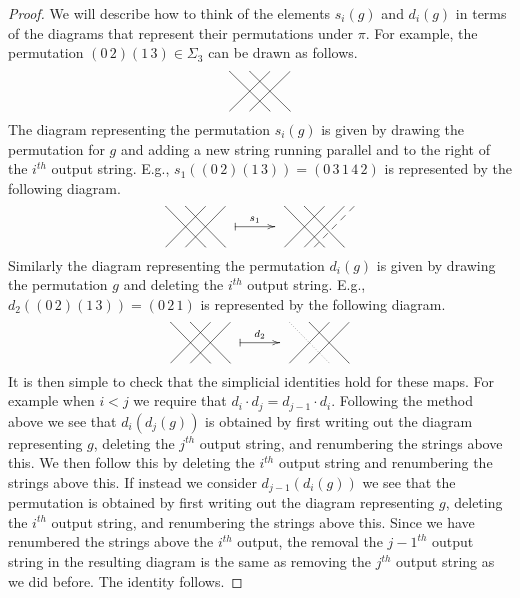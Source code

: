 \documentclass[11pt]{article}
\theoremstyle{definition}
\theoremstyle{plain}
\begin{document}
\begin{proof}
    We will describe how to think of the elements $s_i(g)$ and $d_i(g)$ in terms of the diagrams that represent their permutations under $\pi$. For example, the permutation $(0 \, 2)(1 \, 3) \in \Sigma_{3}$ can be drawn as follows.
        \[
            \xy
                {\ar@{-} (0,0) ; (10,-10)};
                {\ar@{-} (5,0) ; (15,-10)};
                {\ar@{-} (10,0) ; (0,-10)};
                {\ar@{-} (15,0) ; (5,-10)};
            \endxy
        \]
    The diagram representing the permutation $s_i(g)$ is given by drawing the permutation for $g$ and adding a new string running parallel and to the right of the $i^{th}$ output string. E.g., $s_1((0 \, 2)(1 \, 3)) = (0 \, 3 \, 1 \, 4 \, 2)$ is represented by the following diagram.
        \[
             \xy
                {\ar@{-} (0,0) ; (10,-10)};
                {\ar@{-} (5,0) ; (15,-10)};
                {\ar@{-} (10,0) ; (0,-10)};
                {\ar@{-} (15,0) ; (5,-10)};
                {\ar@{|->}^{s_1} (17.5,-5) ; (27.5,-5)};
                {\ar@{-} (30,0) ; (40,-10)};
                {\ar@{-} (35,0) ; (45,-10)};
                {\ar@{-} (40,0) ; (30,-10)};
                {\ar@{-} (45,0) ; (35,-10)};
                {\ar@{--} (47.5,0) ; (37.5,-10)};
            \endxy
        \]
    Similarly the diagram representing the permutation $d_i(g)$ is given by drawing the permutation $g$ and deleting the $i^{th}$ output string. E.g., $d_2((0 \, 2)(1 \, 3)) = (0 \, 2 \, 1)$ is represented by the following diagram.
        \[
             \xy
                {\ar@{-} (0,0) ; (10,-10)};
                {\ar@{-} (5,0) ; (15,-10)};
                {\ar@{-} (10,0) ; (0,-10)};
                {\ar@{-} (15,0) ; (5,-10)};
                {\ar@{|->}^{d_2} (17.5,-5) ; (27.5,-5)};
                {\ar@{.} (30,0) ; (40,-10)};
                {\ar@{-} (35,0) ; (45,-10)};
                {\ar@{-} (40,0) ; (30,-10)};
                {\ar@{-} (45,0) ; (35,-10)};
            \endxy
        \]
    It is then simple to check that the simplicial identities hold for these maps. For example when $i < j$ we require that $d_i \cdot d_j = d_{j-1} \cdot d_i$. Following the method above we see that $d_i(d_j(g))$ is obtained by first writing out the diagram representing $g$, deleting the $j^{th}$ output string, and renumbering the strings above this. We then follow this by deleting the $i^{th}$ output string and renumbering the strings above this. If instead we consider $d_{j-1}(d_i(g))$ we see that the permutation is obtained by first writing out the diagram representing $g$, deleting the ${i}^{th}$ output string, and renumbering the strings above this. Since we have renumbered the strings above the $i^{th}$ output, the removal the ${j-1}^{th}$ output string in the resulting diagram is the same as removing the $j^{th}$ output string as we did before. The identity follows.
    

\end{proof}
\end{document}

